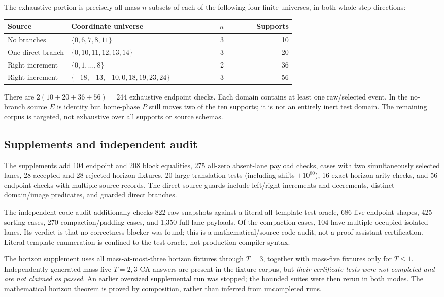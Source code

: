 \documentclass[11pt,a4paper]{article}
\numberwithin{equation}{section}
\begin{document}
The exhaustive portion is precisely all mass-$n$ subsets of each of the following four finite universes, in both whole-step directions:
\begin{center}
\begin{tabular}{@{}p{0.22\linewidth}p{0.49\linewidth}rr@{}}\toprule
Source & Coordinate universe & $n$ & Supports\\\midrule
No branches & $\{0,6,7,8,11\}$ & 3 & 10\\
One direct branch & $\{0,10,11,12,13,14\}$ & 3 & 20\\
Right increment & $\{0,1,\ldots,8\}$ & 2 & 36\\
Right increment & $\{-18,-13,-10,0,18,19,23,24\}$ & 3 & 56\\\bottomrule
\end{tabular}
\end{center}
There are $2(10+20+36+56)=244$ exhaustive endpoint checks. Each domain contains at least one raw/selected event. In the no-branch source $E$ is identity but home-phase $P$ still moves two of the ten supports; it is not an entirely inert test domain. The remaining corpus is targeted, not exhaustive over all supports or source schemas.

\subsection{Supplements and independent audit}
The supplements add 104 endpoint and 208 block equalities, 275 all-zero absent-lane payload checks, cases with two simultaneously selected lanes, 28 accepted and 28 rejected horizon fixtures, 20 large-translation tests (including shifts $\pm10^{80}$), 16 exact horizon-arity checks, and 56 endpoint checks with multiple source records. The direct source guards include left/right increments and decrements, distinct domain/image predicates, and guarded direct branches.

The independent code audit additionally checks 822 raw snapshots against a literal all-template test oracle, 686 live endpoint shapes, 425 sorting cases, 270 compaction/padding cases, and 1,350 full lane payloads. Of the compaction cases, 104 have multiple occupied isolated lanes. Its verdict is that no correctness blocker was found; this is a mathematical/source-code audit, not a proof-assistant certification. Literal template enumeration is confined to the test oracle, not production compiler syntax.

The horizon supplement uses all mass-at-most-three horizon fixtures through $T=3$, together with mass-five fixtures only for $T\le1$. Independently generated mass-five $T=2,3$ CA answers are present in the fixture corpus, but \emph{their certificate tests were not completed and are not claimed as passed}. An earlier oversized supplemental run was stopped; the bounded suites were then rerun in both modes. The mathematical horizon theorem is proved by composition, rather than inferred from uncompleted runs.
\end{document}
